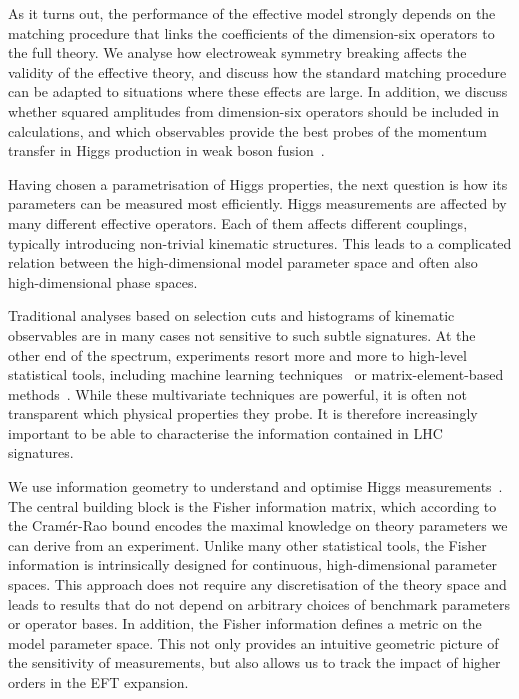 As it turns out, the performance of the effective model strongly
depends on the matching procedure that links the coefficients of the
dimension-six operators to the full theory. We analyse how electroweak
symmetry breaking affects the validity of the effective theory, and
discuss how the standard matching procedure can be adapted to
situations where these effects are large. In addition, we discuss
whether squared amplitudes from dimension-six operators should be
included in calculations, and which observables provide the best
probes of the momentum transfer in Higgs production in weak boson
fusion~\cite{Biekotter:2016ecg}.

\newparagraph
%
Having chosen a parametrisation of Higgs properties, the next question
is how its parameters can be measured most efficiently. Higgs
measurements are affected by many different effective operators. Each of
them affects different couplings, typically introducing non-trivial
kinematic structures. This leads to a complicated relation between the
high-dimensional model parameter space and often also high-dimensional
phase spaces.

Traditional analyses based on selection cuts and histograms of
kinematic observables are in many cases not sensitive to such subtle
signatures.  At the other end of the spectrum, experiments resort more
and more to high-level statistical tools, including machine learning
techniques~\cite{Cranmer:2015bka, Louppe:2016ylz, Louppe:2016aov,
  Cranmer:2016lzt, Baldi:2016fzo, Brehmer:ghost_probability,
  Cogan:2014oua, Baldi:2014pta, deOliveira:2015xxd, Almeida:2015jua,
  Baldi:2016fql, Guest:2016iqz, Komiske:2016rsd, Kasieczka:2017nvn,
  Louppe:2017ipp, Baldi:2014kfa, Searcy:2015apa, Santos:2016kno,
  Alves:2016htj, Buckley:2011kc, Bornhauser:2013aya, Bechtle:2017vyu}
or matrix-element-based methods~\cite{Kondo:1988yd, Abazov:2004cs,
  Gao:2010qx, Alwall:2010cq, Avery:2012um, Andersen:2012kn,
  Campbell:2013hz, Artoisenet:2013vfa, Martini:2015fsa,
  Gritsan:2016hjl, Soper:2011cr, Soper:2012pb, Soper:2014rya,
  Atwood:1991ka, Davier:1992nw, Diehl:1993br}. While these
multivariate techniques are powerful, it is often not transparent
which physical properties they probe. It is therefore increasingly
important to be able to characterise the information contained in LHC
signatures.

We use information geometry to understand and optimise Higgs
measurements~\cite{Brehmer:2016nyr}.  The central building block is
the Fisher information matrix, which according to the Cram\'er-Rao
bound encodes the maximal knowledge on theory parameters we can derive
from an experiment. Unlike many other statistical tools, the Fisher
information is intrinsically designed for continuous, high-dimensional
parameter spaces. This approach does not require any discretisation of
the theory space and leads to results that do not depend on arbitrary
choices of benchmark parameters or operator bases. In addition, the
Fisher information defines a metric on the model parameter space. This
not only provides an intuitive geometric picture of the sensitivity of
measurements, but also allows us to track the impact of higher orders
in the EFT expansion.

